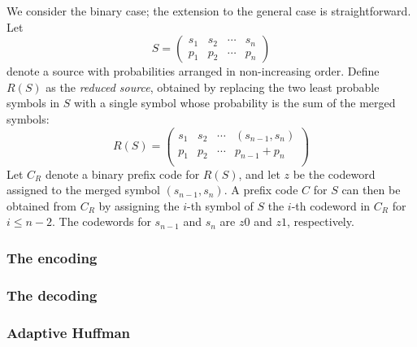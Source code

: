 \documentclass{subfiles}
\begin{document}
    We consider the binary case; the extension to the general case is straightforward.
    Let 
    \[
        S = \begin{pmatrix}
            s_{1} & s_{2} & \cdots & s_{n} \\ 
            p_{1} & p_{2} & \cdots & p_{n} 
        \end{pmatrix}
    \]
    denote a source with probabilities arranged in non-increasing order.
    Define \(R(S)\) as the \emph{reduced source}, 
        obtained by replacing the two least probable symbols in \(S\)
        with a single symbol whose probability is the sum of the merged symbols:
        \[
            R(S) = \begin{pmatrix}
                s_{1} & s_{2} & \cdots & (s_{n - 1}, s_{n}) \\ 
                p_{1} & p_{2} & \cdots & p_{n - 1} + p_{n} \\
            \end{pmatrix}
        \]
    Let \(C_{R}\) denote a binary prefix code for \(R(S)\), 
        and let \(z\) be the codeword assigned to the merged symbol \((s_{n - 1}, s_{n})\).
    A prefix code \(C\) for \(S\) can then be obtained from \(C_{R}\) by assigning 
        the \(i\)-th symbol of \(S\) the \(i\)-th codeword in \(C_{R}\) for \(i \le n - 2\). 
        The codewords for \(s_{n - 1}\) and \(s_{n}\) are \(z0\) and \(z1\), respectively.

    \clearpage 
    \subsubsection{The encoding}
    

    \subsubsection{The decoding}
    

    \subsubsection{Adaptive Huffman}
    
\end{document}
